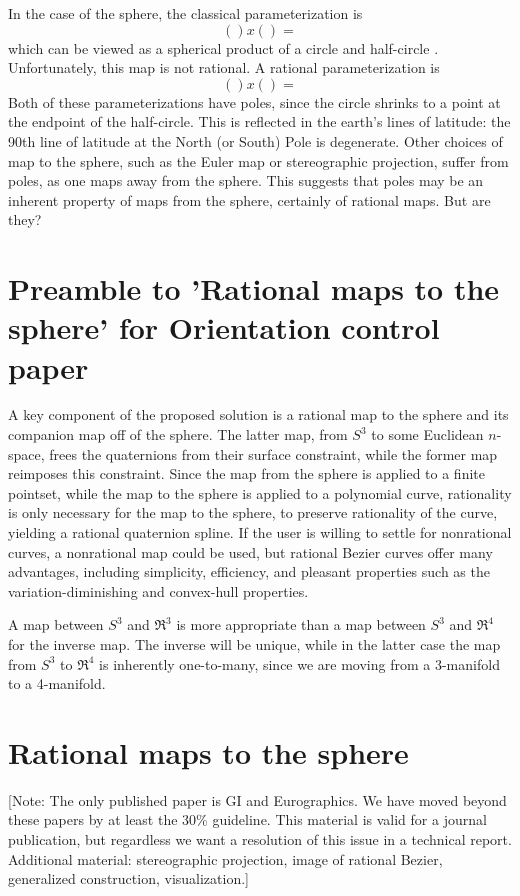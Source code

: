 \documentclass[11pt]{article}
\begin{document}
In the case of the sphere, the classical parameterization is
\[
   () x () = 
\]
which can be viewed as a spherical product of a circle and half-circle \cite{barr}.
Unfortunately, this map is not rational.
A rational parameterization is 
\[
   () x () = 
\]
Both of these parameterizations have poles, since the circle shrinks to a point
at the endpoint of the half-circle.
This is reflected in the earth's lines of latitude: the 90th line of latitude at the
North (or South) Pole is degenerate.
Other choices of map to the sphere, such as the Euler map or 
stereographic projection, suffer from poles, as one maps away from the sphere.
This suggests that poles may be an inherent property of maps from the sphere,
certainly of rational maps.
But are they?

\section{Preamble to 'Rational maps to the sphere' for Orientation control paper}

A key component of the proposed solution is a rational map to the sphere
and its companion map off of the sphere.
The latter map, from $S^3$ to some Euclidean $n$-space, frees the quaternions from
their surface constraint, while the former map reimposes this constraint.
Since the map from the sphere is applied to a finite pointset, while the map
to the sphere is applied to a polynomial curve, rationality is only necessary for the
map to the sphere, to preserve rationality of the curve, yielding a rational
quaternion spline.
If the user is willing to settle for nonrational curves,
a nonrational map could be used,
but rational Bezier curves offer many advantages, including simplicity,
efficiency, and pleasant properties such as the variation-diminishing and convex-hull
properties.

A map between $S^3$ and $\Re^3$ is more appropriate than a map between $S^3$ and $\Re^4$
for the inverse map.
The inverse will be unique, while in the latter case the map from $S^3$ to $\Re^4$ is
inherently one-to-many, since we are moving from a 3-manifold to a 4-manifold.

\section{Rational maps to the sphere}

[Note: The only published paper is GI and Eurographics.
We have moved beyond these papers by at least the 30\% guideline.
This material is valid for a journal publication, but regardless we want a resolution
of this issue in a technical report.
Additional material: stereographic projection, image of rational Bezier,
generalized construction, visualization.]
\end{document}
